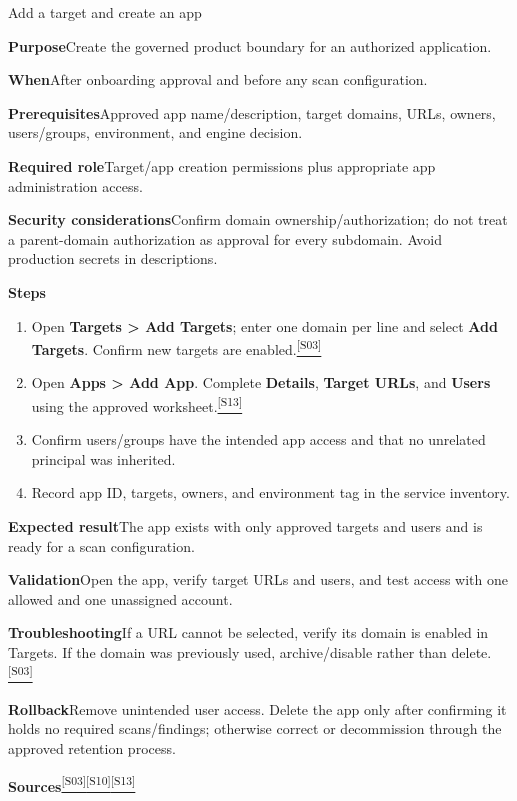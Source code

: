 \documentclass[11pt,letterpaper,oneside]{scrreprt}
\newcommand{\src}[1]{\hyperref[src:#1]{\textsuperscript{\color{R7Orange}[#1]}}}
\newcommand{\uipath}[1]{\textsf{\textbf{#1}}}
\newcommand{\field}[1]{\par\smallskip\noindent\textbf{#1}\quad}
\begin{document}
\begin{procedure}{Add a target and create an app}
\field{Purpose}Create the governed product boundary for an authorized application.
\field{When}After onboarding approval and before any scan configuration.
\field{Prerequisites}Approved app name/description, target domains, URLs, owners, users/groups, environment, and engine decision.
\field{Required role}Target/app creation permissions plus appropriate app administration access.
\field{Security considerations}Confirm domain ownership/authorization; do not treat a parent-domain authorization as approval for every subdomain. Avoid production secrets in descriptions.
\field{Steps}
\begin{enumerate}
  \item Open \uipath{Targets > Add Targets}; enter one domain per line and select \uipath{Add Targets}. Confirm new targets are enabled.\src{S03}
  \item Open \uipath{Apps > Add App}. Complete \uipath{Details}, \uipath{Target URLs}, and \uipath{Users} using the approved worksheet.\src{S13}
  \item Confirm users/groups have the intended app access and that no unrelated principal was inherited.
  \item Record app ID, targets, owners, and environment tag in the service inventory.
\end{enumerate}
\field{Expected result}The app exists with only approved targets and users and is ready for a scan configuration.
\field{Validation}Open the app, verify target URLs and users, and test access with one allowed and one unassigned account.
\field{Troubleshooting}If a URL cannot be selected, verify its domain is enabled in Targets. If the domain was previously used, archive/disable rather than delete.\src{S03}
\field{Rollback}Remove unintended user access. Delete the app only after confirming it holds no required scans/findings; otherwise correct or decommission through the approved retention process.
\field{Sources}\src{S03}\src{S10}\src{S13}
\end{procedure}
\end{document}
